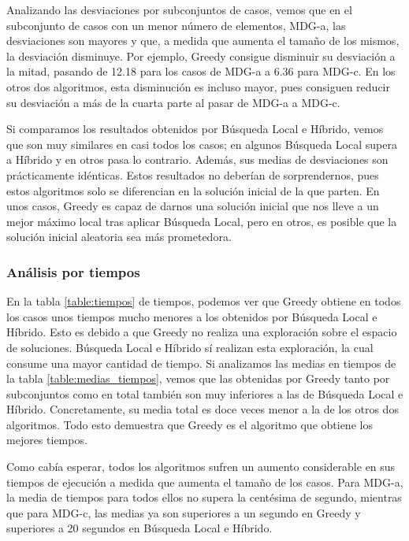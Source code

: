 \documentclass[10pt,a4paper]{article}
\begin{document}
Analizando las desviaciones por subconjuntos de casos, vemos que en el subconjunto de casos con un menor número de elementos, MDG-a, las desviaciones son mayores y que, a medida que aumenta el tamaño de los mismos, la desviación disminuye. Por ejemplo, Greedy consigue disminuir su desviación a la mitad, pasando de 12.18 para los casos de MDG-a a 6.36 para MDG-c. En los otros dos algoritmos, esta disminución es incluso mayor, pues consiguen reducir su desviación a más de la cuarta parte al pasar de MDG-a a MDG-c.

Si comparamos los resultados obtenidos por Búsqueda Local e Híbrido, vemos que son muy similares en casi todos los casos; en algunos Búsqueda Local supera a Híbrido y en otros pasa lo contrario. Además, sus medias de desviaciones son prácticamente idénticas. Estos resultados no deberían de sorprendernos, pues estos algoritmos solo se diferencian en la solución inicial de la que parten. En unos casos, Greedy es capaz de darnos una solución inicial que nos lleve a un mejor máximo local tras aplicar Búsqueda Local, pero en otros, es posible que la solución inicial aleatoria sea más prometedora.



\subsubsection{Análisis por tiempos}

En la tabla \ref{table:tiempos} de tiempos, podemos ver que Greedy obtiene en todos los casos unos tiempos mucho menores a los obtenidos por Búsqueda Local e Híbrido. Esto es debido a que Greedy no realiza una exploración sobre el espacio de soluciones. Búsqueda Local e Híbrido sí realizan esta exploración, la cual consume una mayor cantidad de tiempo. Si analizamos las medias en tiempos de la tabla \ref{table:medias_tiempos}, vemos que las obtenidas por Greedy tanto por subconjuntos como en total también son muy inferiores a las de Búsqueda Local e Híbrido. Concretamente, su media total es doce veces menor a la de los otros dos algoritmos. Todo esto demuestra que Greedy es el algoritmo que obtiene los mejores tiempos.

Como cabía esperar, todos los algoritmos sufren un aumento considerable en sus tiempos de ejecución a medida que aumenta el tamaño de los casos. Para MDG-a, la media de tiempos para todos ellos no supera la centésima de segundo, mientras que para MDG-c, las medias ya son superiores a un segundo en Greedy y superiores a 20 segundos en Búsqueda Local e Híbrido. 
\end{document}
